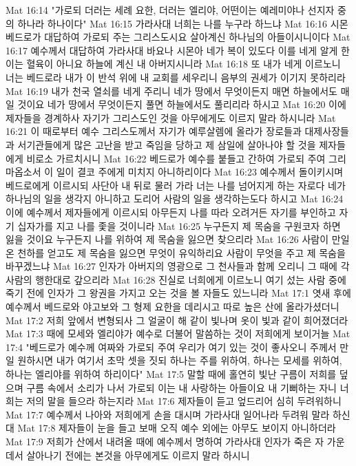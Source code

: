 Mat 16:14  "가로되 더러는 세례 요한, 더러는 엘리야, 어떤이는 예레미야나 선지자 중의 하나라 하나이다"
Mat 16:15  가라사대 너희는 나를 누구라 하느냐
Mat 16:16  시몬 베드로가 대답하여 가로되 주는 그리스도시요 살아계신 하나님의 아들이시니이다
Mat 16:17  예수께서 대답하여 가라사대 바요나 시몬아 네가 복이 있도다 이를 네게 알게 한 이는 혈육이 아니요 하늘에 계신 내 아버지시니라
Mat 16:18  또 내가 네게 이르노니 너는 베드로라 내가 이 반석 위에 내 교회를 세우리니 음부의 권세가 이기지 못하리라
Mat 16:19  내가 천국 열쇠를 네게 주리니 네가 땅에서 무엇이든지 매면 하늘에서도 매일 것이요 네가 땅에서 무엇이든지 풀면 하늘에서도 풀리리라 하시고
Mat 16:20  이에 제자들을 경계하사 자기가 그리스도인 것을 아무에게도 이르지 말라 하시니라
Mat 16:21  이 때로부터 예수 그리스도께서 자기가 예루살렘에 올라가 장로들과 대제사장들과 서기관들에게 많은 고난을 받고 죽임을 당하고 제 삼일에 살아나야 할 것을 제자들에게 비로소 가르치시니
Mat 16:22  베드로가 예수를 붙들고 간하여 가로되 주여 그리 마옵소서 이 일이 결코 주에게 미치지 아니하리이다
Mat 16:23  예수께서 돌이키시며 베드로에게 이르시되 사단아 내 뒤로 물러 가라 너는 나를 넘어지게 하는 자로다 네가 하나님의 일을 생각지 아니하고 도리어 사람의 일을 생각하는도다 하시고
Mat 16:24  이에 예수께서 제자들에게 이르시되 아무든지 나를 따라 오려거든 자기를 부인하고 자기 십자가를 지고 나를 좇을 것이니라
Mat 16:25  누구든지 제 목숨을 구원코자 하면 잃을 것이요 누구든지 나를 위하여 제 목숨을 잃으면 찾으리라
Mat 16:26  사람이 만일 온 천하를 얻고도 제 목숨을 잃으면 무엇이 유익하리요 사람이 무엇을 주고 제 목숨을 바꾸겠느냐
Mat 16:27  인자가 아버지의 영광으로 그 천사들과 함께 오리니 그 때에 각 사람의 행한대로 갚으리라
Mat 16:28  진실로 너희에게 이르노니 여기 섰는 사람 중에 죽기 전에 인자가 그 왕권을 가지고 오는 것을 볼 자들도 있느니라
Mat 17:1  엿새 후에 예수께서 베드로와 야고보와 그 형제 요한을 데리시고 따로 높은 산에 올라가셨더니
Mat 17:2  저희 앞에서 변형되사 그 얼굴이 해 같이 빛나며 옷이 빛과 같이 희어졌더라
Mat 17:3  때에 모세와 엘리야가 예수로 더불어 말씀하는 것이 저희에게 보이거늘
Mat 17:4  "베드로가 예수께 여짜와 가로되 주여 우리가 여기 있는 것이 좋사오니 주께서 만일 원하시면 내가 여기서 초막 셋을 짓되 하나는 주를 위하여, 하나는 모세를 위하여, 하나는 엘리야를 위하여 하리이다"
Mat 17:5  말할 때에 홀연히 빛난 구름이 저희를 덮으며 구름 속에서 소리가 나서 가로되 이는 내 사랑하는 아들이요 내 기뻐하는 자니 너희는 저의 말을 들으라 하는지라
Mat 17:6  제자들이 듣고 엎드리어 심히 두려워하니
Mat 17:7  예수께서 나아와 저희에게 손을 대시며 가라사대 일어나라 두려워 말라 하신대
Mat 17:8  제자들이 눈을 들고 보매 오직 예수 외에는 아무도 보이지 아니하더라
Mat 17:9  저희가 산에서 내려올 때에 예수께서 명하여 가라사대 인자가 죽은 자 가운데서 살아나기 전에는 본것을 아무에게도 이르지 말라 하시니
